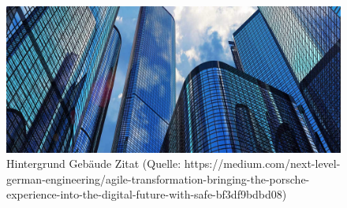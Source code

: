 \begin{figure}[htb]
	\centering
	\includegraphics[width=\textwidth]{img/backgroundCompany.png}
	\caption[Hintergrund Gebäude Zitat (Quelle: https://medium.com/next-level-german-engineering/agile-transformation-bringing-the-porsche-experience-into-the-digital-future-with-safe-bf3df9bdbd08
	)]{Hintergrund Gebäude Zitat (Quelle: https://medium.com/next-level-german-engineering/agile-transformation-bringing-the-porsche-experience-into-the-digital-future-with-safe-bf3df9bdbd08)}
	\label{fig:backgroundCompany}
\end{figure}
